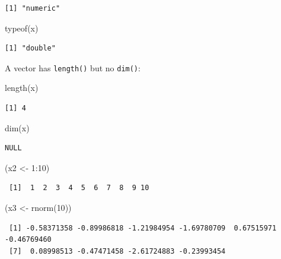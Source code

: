 \documentclass[
]{book}
\newenvironment{Shaded}{\begin{snugshade}}{\end{snugshade}}
\newcommand{\DecValTok}[1]{\textcolor[rgb]{0.00,0.00,0.81}{#1}}
\newcommand{\FunctionTok}[1]{\textcolor[rgb]{0.00,0.00,0.00}{#1}}
\newcommand{\NormalTok}[1]{#1}
\newcommand{\OtherTok}[1]{\textcolor[rgb]{0.56,0.35,0.01}{#1}}
\newcommand{\SpecialCharTok}[1]{\textcolor[rgb]{0.00,0.00,0.00}{#1}}
\begin{document}
\begin{verbatim}
[1] "numeric"
\end{verbatim}

\begin{Shaded}
\begin{Highlighting}[]
\FunctionTok{typeof}\NormalTok{(x)}
\end{Highlighting}
\end{Shaded}

\begin{verbatim}
[1] "double"
\end{verbatim}

A vector has \texttt{length()} but no \texttt{dim()}:

\begin{Shaded}
\begin{Highlighting}[]
\FunctionTok{length}\NormalTok{(x)}
\end{Highlighting}
\end{Shaded}

\begin{verbatim}
[1] 4
\end{verbatim}

\begin{Shaded}
\begin{Highlighting}[]
\FunctionTok{dim}\NormalTok{(x)}
\end{Highlighting}
\end{Shaded}

\begin{verbatim}
NULL
\end{verbatim}

\begin{Shaded}
\begin{Highlighting}[]
\NormalTok{(x2 }\OtherTok{\textless{}{-}} \DecValTok{1}\SpecialCharTok{:}\DecValTok{10}\NormalTok{)}
\end{Highlighting}
\end{Shaded}

\begin{verbatim}
 [1]  1  2  3  4  5  6  7  8  9 10
\end{verbatim}

\begin{Shaded}
\begin{Highlighting}[]
\NormalTok{(x3 }\OtherTok{\textless{}{-}} \FunctionTok{rnorm}\NormalTok{(}\DecValTok{10}\NormalTok{))}
\end{Highlighting}
\end{Shaded}

\begin{verbatim}
 [1] -0.58371358 -0.89986818 -1.21984954 -1.69780709  0.67515971 -0.46769460
 [7]  0.08998513 -0.47471458 -2.61724883 -0.23993454
\end{verbatim}
\end{document}
